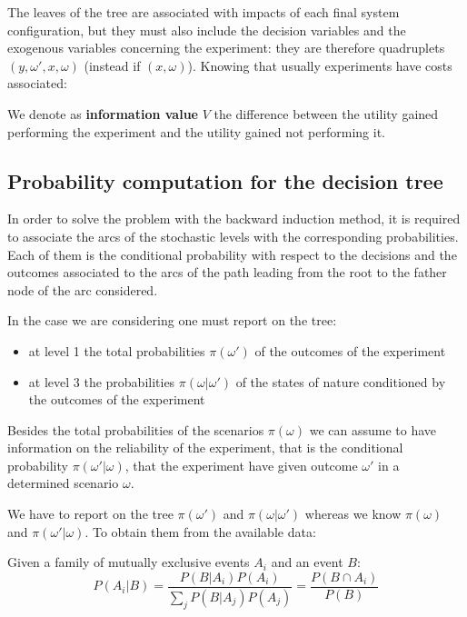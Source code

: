 The leaves of the tree are associated with impacts of each final system configuration, but they must also include the decision variables and the exogenous variables concerning the experiment: they are therefore quadruplets $(y, \omega', x, \omega)$ (instead if $(x, \omega)$). Knowing that usually experiments have costs associated: \\

\begin{definition}
	We denote as \textbf{information value} $V$ the difference between the utility gained performing the experiment and the utility gained not performing it.
\end{definition}

\subsection{Probability computation for the decision tree}

In order to solve the problem with the backward induction method, it is required to associate the arcs of the stochastic levels with the corresponding probabilities. Each of them is the conditional probability with respect to the decisions and the outcomes associated to the arcs of the path leading from the root to the father node of the arc considered.

In the case we are considering one must report on the tree:
\begin{itemize}
	\item at level 1 the total probabilities $\pi (\omega')$ of the outcomes of the experiment
	
	\item at level 3 the probabilities $\pi (\omega|\omega')$ of the states of nature conditioned by the outcomes of the experiment
\end{itemize}

Besides the total probabilities of the scenarios $\pi (\omega)$ we can assume to have information on the reliability of the experiment, that is the conditional probability $\pi(\omega' | \omega)$, that the experiment have given outcome $\omega'$ in a determined scenario $\omega$.

We have to report on the tree $\pi(\omega')$ and $\pi(\omega|\omega')$ whereas we know $\pi(\omega)$ and $\pi(\omega' | \omega)$. To obtain them from the available data:\\

\begin{theo}
	Given a family of mutually exclusive events $A_i$ and an event $B$:
	$$ P(A_i | B) = \frac{P(B|A_i) P(A_i)}{\sum_j P(B|A_j) P(A_j)} = \frac{P (B \cap A_i)}{P(B)} $$
\end{theo}

